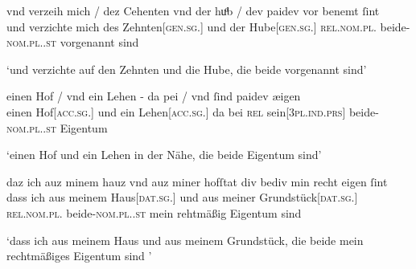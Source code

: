 \begin{exe}
\ex \label{ex:iclgr2}
\begin{xlist}
	\ex \label{ex:iclgr2_1}
		\gll vnd verzeih mich / \textelp{}  dez Cehenten vnd der huͦb 
				/ dev paidev {vor benemt} ſint \\
			und verzichte mich {} {} des Zehnten[\textsc{gen.sg.\MascI}] und der
				Hube[\textsc{gen.sg.\FemI}] {} \textsc{rel.nom.pl.\NeutI}
				beide-\textsc{nom.pl.\NeutI.st} vorgenannt sind \\
			\begin{taggedline}{\parencites(Regensburg, 1299)[\pno~3261, 424.38--39]{cao4}}
			\trans `und verzichte \textelp{} auf den Zehnten und die Hube,
				die beide vorgenannt sind'
			\end{taggedline}

	\ex \label{ex:iclgr2_2}
		\gll einen Hof / vnd ein Lehen - da pei / vnd ſind
				paidev æigen \\
			einen Hof[\textsc{acc.sg.\MascI}] {} und ein Lehen[\textsc{acc.sg.\NeutI}] {} da
				bei {} \textsc{rel} sein[\textsc{3pl\subM.ind.prs}]
				beide-\textsc{nom.pl.\NeutI.st} Eigentum \\
			\begin{taggedline}{\parencites(Steyr, 1294)[\pno~1923, 194.36--37]{cao3}}
			\trans `einen Hof und ein Lehen in der Nähe, die beide
				Eigentum sind'
			\end{taggedline}

	\ex \label{ex:iclgr2_3}
		\gll daz ich auz minem hauz vnd auz miner hofſtat
				div bediv min recht eigen ſint \textelp{} \\
			dass ich aus meinem Haus[\textsc{dat.sg.\NeutI}] und aus meiner
				Grundstück[\textsc{dat.sg.\FemI}] \textsc{rel.nom.pl.\NeutI}
				beide-\textsc{nom.pl.\NeutI.st} mein rehtmäßig Eigentum sind {} \\
			\begin{taggedline}{\parencites(Ulm und Kl.~Raitenhaslach, Kr.~Altötting, 1282)[\pno~1282, 526.37--38]{cao2}}
			\trans `dass ich aus meinem Haus und aus meinem Grundstück, 
				die beide mein rechtmäßiges Eigentum sind \textelp{}'
			\end{taggedline}
	\end{xlist}
\end{exe}

